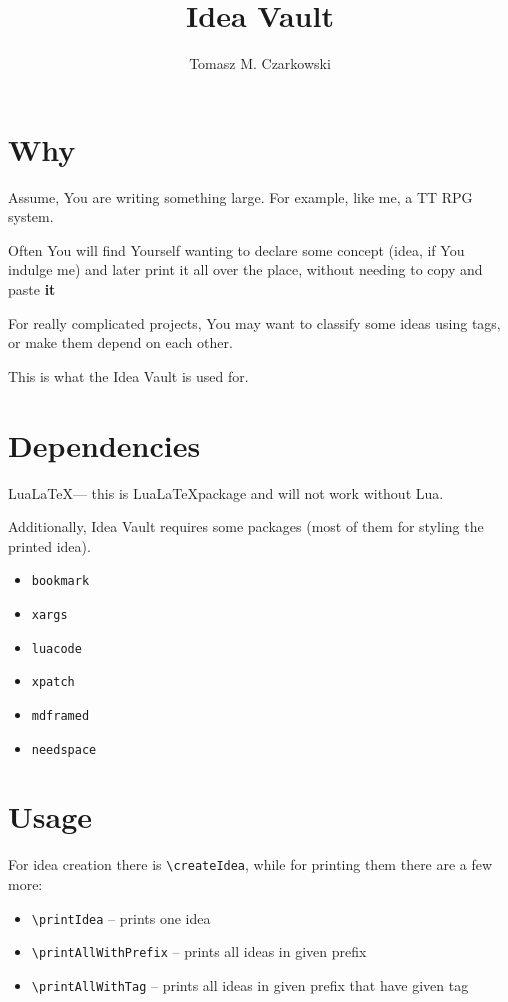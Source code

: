\documentclass[11pt]{article}
\author{Tomasz M. Czarkowski}
\title{Idea Vault}
\begin{document}
\maketitle

\section{Why}
\par Assume, You are writing something large. For example, like me, a TT RPG system.
\par Often You will find Yourself wanting to declare some concept (idea, if You indulge me) and later print it all over the place, without needing to copy and paste \textbf{it}
\par For really complicated projects, You may want to classify some ideas using tags, or make them depend on each other.
\par This is what the Idea Vault is used for.

\section{Dependencies}
\par Lua\LaTeX --- this is Lua\LaTeX package and will not work without Lua.
\par Additionally, Idea Vault requires some packages (most of them for styling the printed idea).
\begin{itemize}
\item \texttt{bookmark}
\item \texttt{xargs}
\item \texttt{luacode}
\item \texttt{xpatch}
\item \texttt{mdframed}
\item \texttt{needspace}
\end{itemize}

\section{Usage}
\par For idea creation there is \texttt{\textbackslash{}createIdea}, while for printing them there are a few more:
\begin{itemize}
\item \texttt{\textbackslash{}printIdea} -- prints one idea
\item \texttt{\textbackslash{}printAllWithPrefix} -- prints all ideas in given prefix
\item \texttt{\textbackslash{}printAllWithTag} -- prints all ideas in given prefix that have given tag
\end{itemize}
\end{document}
